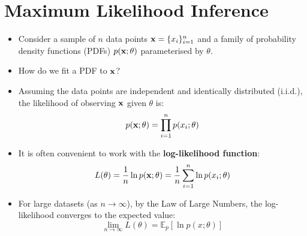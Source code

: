 \section{Maximum Likelihood Inference}


\begin{itemize}
    \item Consider a sample of \( n \) data points \( \mathbf{x} = \{x_i\}_{i=1}^n \) and a family of probability density functions (PDFs) \( p(\mathbf{x}; \theta) \) parameterised by \( \theta \).
    \item How do we fit a PDF to $\mathbf{x}$?


    \item Assuming the data points are independent and identically distributed (i.i.d.), the likelihood of observing \( \mathbf{x} \) given \( \theta \) is:
          \[
              p(\mathbf{x}; \theta) = \prod_{i=1}^n p(x_i; \theta)
          \]

    \item It is often convenient to work with the \textbf{log-likelihood function}:
          \[
              L(\theta) = \frac{1}{n} \ln p(\mathbf{x}; \theta) = \frac{1}{n} \sum_{i=1}^n \ln p(x_i; \theta)
          \]

    \item For large datasets (as \( n \to \infty \)), by the Law of Large Numbers, the log-likelihood converges to the expected value:
          \[
              \lim_{n \to \infty} L(\theta) = \mathbb{E}_p [\ln p(x; \theta)]
          \]
\end{itemize}

